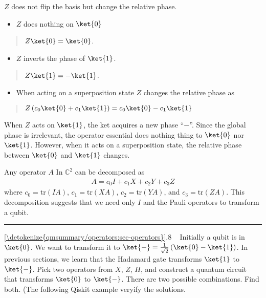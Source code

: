 \documentclass[letterpaper,10pt,english]{jupyterBook}
\begin{document}
\sphinxAtStartPar
\(Z\) does not flip the basis but change the relative phase.
\begin{itemize}
\item {}
\sphinxAtStartPar
\(Z\) does nothing on \(\ket{0}\)

\end{itemize}
\begin{quote}

\sphinxAtStartPar
\(Z \ket{0} = \ket{0}\).
\end{quote}
\begin{itemize}
\item {}
\sphinxAtStartPar
\(Z\) inverts the phase of \(\ket{1}\).

\end{itemize}
\begin{quote}

\sphinxAtStartPar
\(Z \ket{1} = - \ket{1}\).
\end{quote}
\begin{itemize}
\item {}
\sphinxAtStartPar
When acting on a superposition state \(Z\) changes the relative phase as

\end{itemize}
\begin{quote}

\sphinxAtStartPar
\(Z \left(c_0\ket{0} + c_1 \ket{1}\right) = c_0\ket{0} - c_1 \ket{1}\)
\end{quote}

\sphinxAtStartPar
When \(Z\) acts on \(\ket{1}\), the ket acquires a new phase “\(-\)”. Since the global phase is irrelevant, the operator essential does nothing thing to \(\ket{0}\) nor \(\ket{1}\). However, when it acts on a superposition state, the relative phase between \(\ket{0}\) and \(\ket{1}\) changes.

\sphinxAtStartPar
Any operator \(A\) In \(\mathbb{C}^2\) can be decomposed as
\begin{equation*}
\begin{split}
A = c_0 I + c_1 X + c_2 Y + c_3 Z
\end{split}
\end{equation*}
\sphinxAtStartPar
where \(c_0 = \text{tr}(I A)\), \(c_1 = \text{tr}(X A)\), \(c_2 = \text{tr}(Y A)\), and \(c_3 = \text{tr}(Z A)\).  This decomposition suggests that we need only \(I\) and the Pauli operators to transform a qubit.


\bigskip\hrule\bigskip


\sphinxAtStartPar
{} \hyperref[\detokenize{qmsummary/operators:sec-operators}]{\ref{\detokenize{qmsummary/operators:sec-operators}}}.8     Initially a qubit is in \(\ket{0}\). We want to transform it to \(\ket{-} = \frac{1}{\sqrt{2}} \left(\ket{0} - \ket{1}\right)\). In previous sections, we learn that the Hadamard gate transforms \(\ket{1}\) to \(\ket{-}\). Pick two operators from \(X\), \(Z\), \(H\), and construct a quantum circuit that transforms \(\ket{0}\) to \(\ket{-}\).  There are two possible combinations. Find both.  (The following Qiskit example veryify the solutions.
\end{document}
